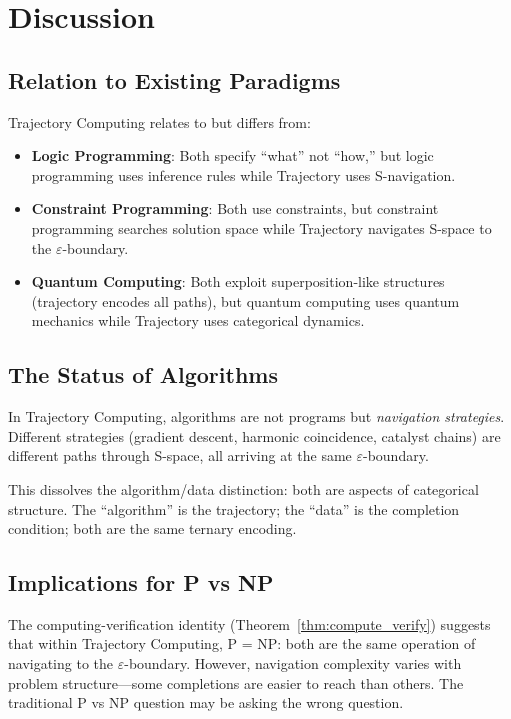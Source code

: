 \documentclass[twocolumn,10pt]{article}
\theoremstyle{remark}
\newcommand{\eps}{\varepsilon}
\begin{document}
\section{Discussion}
\label{sec:discussion}

\subsection{Relation to Existing Paradigms}

Trajectory Computing relates to but differs from:

\begin{itemize}
    \item \textbf{Logic Programming}: Both specify ``what'' not ``how,'' but logic programming uses inference rules while Trajectory uses S-navigation.

    \item \textbf{Constraint Programming}: Both use constraints, but constraint programming searches solution space while Trajectory navigates S-space to the $\eps$-boundary.

    \item \textbf{Quantum Computing}: Both exploit superposition-like structures (trajectory encodes all paths), but quantum computing uses quantum mechanics while Trajectory uses categorical dynamics.
\end{itemize}

\subsection{The Status of Algorithms}

In Trajectory Computing, algorithms are not programs but \textit{navigation strategies}. Different strategies (gradient descent, harmonic coincidence, catalyst chains) are different paths through S-space, all arriving at the same $\eps$-boundary.

This dissolves the algorithm/data distinction: both are aspects of categorical structure. The ``algorithm'' is the trajectory; the ``data'' is the completion condition; both are the same ternary encoding.

\subsection{Implications for P vs NP}

The computing-verification identity (Theorem~\ref{thm:compute_verify}) suggests that within Trajectory Computing, P = NP: both are the same operation of navigating to the $\eps$-boundary. However, navigation complexity varies with problem structure---some completions are easier to reach than others. The traditional P vs NP question may be asking the wrong question.
\end{document}

